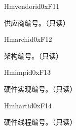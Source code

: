 
\begin{register}{H}{mvendorid}{0xF11}\label{regdesc:MVENDORID}
%
\regnewline%
\begin{regdesc}\begin{reglist}
\label{fielddesc:MVENDORID}\item [MVENDORID] 供应商编号。（只读）
\end{reglist}\end{regdesc}
\end{register}

\begin{register}{H}{marchid}{0xF12}\label{regdesc:MARCHID}
%
\regnewline%
\begin{regdesc}\begin{reglist}
\label{fielddesc:MARCHID}\item [MARCHID] 架构编号。（只读）
\end{reglist}\end{regdesc}
\end{register}

\begin{register}{H}{mimpid}{0xF13}\label{regdesc:MIMPID}
%
\regnewline%
\begin{regdesc}\begin{reglist}
\label{fielddesc:MIMPID}\item [MIMPID] 硬件实现编号。（只读）
\end{reglist}\end{regdesc}
\end{register}

\begin{register}{H}{mhartid}{0xF14}\label{regdesc:MHARTID}
%
\regnewline%
\begin{regdesc}\begin{reglist}
\label{fielddesc:MHARTID}\item [MHARTID] 硬件线程编号。（只读）
\end{reglist}\end{regdesc}
\end{register}

